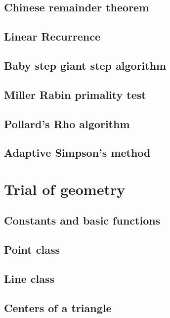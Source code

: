 \documentclass[UTF8,a4paper]{report}
\begin{document}
		\section{Chinese remainder theorem}
			
		\section{Linear Recurrence}
			
		\section{Baby step giant step algorithm}
			
		\section{Miller Rabin primality test}
			
		\section{Pollard's Rho algorithm}
			
		\section{Adaptive Simpson's method}
			
	\chapter{Trial of geometry}
		\section{Constants and basic functions}
			
		\section{Point class}
			
		\section{Line class}
			
		\section{Centers of a triangle}
			
\end{document}
